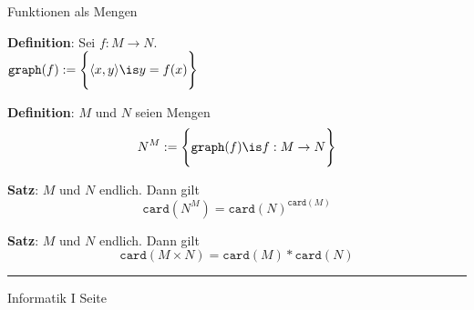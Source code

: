 
\begin{slide}{}
\normalsize
\begin{center}
Funktionen als Mengen
\end{center}
\vspace{0.5cm}

\footnotesize
\textbf{Definition}: Sei $f: M \rightarrow N$. \\[0.3cm]
\hspace*{1.3cm} $\texttt{graph}(f) := \left\{ \rule{0pt}{16pt} \langle x, y \rangle \is y = f(x) \right\}$
\vspace{0.5cm}

\textbf{Definition}: $M$ und $N$ seien Mengen 
$$  N^M := \left\{ \mathtt{graph}(f) \is f: M \rightarrow N \rule{0pt}{16pt} \right\} $$


\textbf{Satz}: $M$ und $N$ endlich.  Dann gilt
$$  \mathtt{card}(N^M) = \mathtt{card}(N)^{\mathtt{card}(M)} $$

\textbf{Satz}:  $M$ und $N$ endlich.  Dann gilt
$$  \mathtt{card}(M \times N) = \mathtt{card}(M) * \mathtt{card}(N) $$

\vspace*{\fill}
\tiny \addtocounter{mypage}{1}
\rule{15cm}{1mm}
Informatik I  \hspace*{\fill} Seite 
\end{slide}


